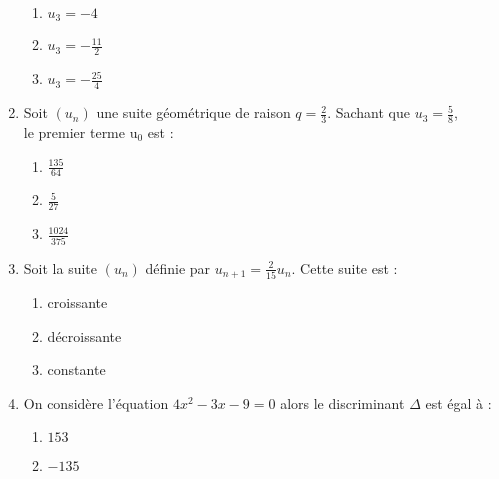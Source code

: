 \documentclass[oneside,twocolumn,landscape]{book}
\begin{document}
\begin{enumerate}
\begin{enumerate}
\item\MauvaiseReponse $u_{3}=-4$


\item\MauvaiseReponse $u_{3}=-\frac{11}{2}$


\item\BonneReponse $u_{3}=-\frac{25}{4}$


\end{enumerate}




\item Soit $\left(u_{n}\right)$ une suite géométrique de raison $q=\frac{2}{3}$. Sachant que $u_{3}=\frac{5}{8}$,\\ le premier terme $\mathrm{u}_ {0}$ est :

\begin{enumerate}


\item\BonneReponse $\frac{135}{64}$


\item\MauvaiseReponse $\frac{5}{27}$


\item\MauvaiseReponse $\frac{1024}{375}$


\end{enumerate}




\item Soit la suite $\left(u_{n}\right)$ définie par $u_{n+1}=\frac{2}{15}u_n$. Cette suite est :

\begin{enumerate}


\item\MauvaiseReponse croissante


\item\BonneReponse décroissante


\item\MauvaiseReponse constante


\end{enumerate}


\newpage


\item On considère l'équation $4x^{2}-3 x-9=0$ alors le discriminant $\Delta$ est égal à :

\begin{enumerate}


\item\BonneReponse $153$


\item\MauvaiseReponse $-135$



\end{enumerate}
\end{enumerate}
\end{document}
